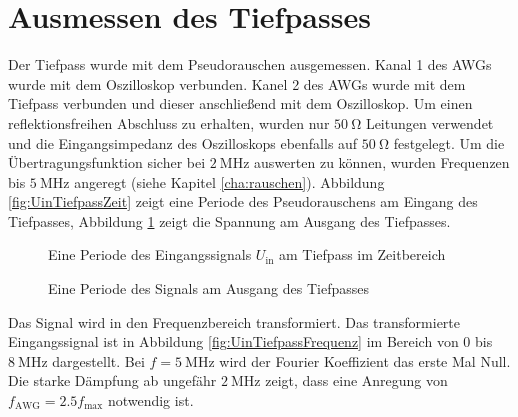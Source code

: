 \documentclass[12pt,report,final,twoside,accentcolor=tud9b,bigchapter]{tudreport}
\newcommand{\Uin}{U_\textrm{in}}
\newcommand{\Uout}{U_\textrm{out}}
\begin{document}
\section{Ausmessen des Tiefpasses}
Der Tiefpass wurde mit dem Pseudorauschen ausgemessen. Kanal 1 des AWGs wurde mit dem Oszilloskop verbunden. Kanel 2 des AWGs wurde mit dem Tiefpass verbunden und dieser anschließend mit dem Oszilloskop. Um einen reflektionsfreihen Abschluss zu erhalten, wurden nur $\SI{50}{\ohm}$ Leitungen verwendet und die Eingangsimpedanz des Oszilloskops ebenfalls auf $\SI{50}{\ohm}$ festgelegt.
Um die Übertragungsfunktion sicher bei $\SI{2}{\mega\hertz}$ auswerten zu können, wurden Frequenzen bis $\SI{5}{\mega\hertz}$ angeregt (siehe Kapitel \ref{cha:rauschen}). Abbildung \ref{fig:UinTiefpassZeit} zeigt eine Periode des Pseudorauschens am Eingang des Tiefpasses, Abbildung \ref{fig:UoutTiefpassZeit} zeigt die Spannung am Ausgang des Tiefpasses. 
\begin{figure}[h!] 
\begin{minipage}[t]{0.48\linewidth}     
  \centering
  \caption{Eine Periode des Eingangssignals $\Uin$ am Tiefpass im Zeitbereich}
  \label{fig:UinTiefpassZeit}
\end{minipage}
  \hfill
\begin{minipage}[t]{0.48\linewidth}     
  \centering
  \caption{Eine Periode des Signals am Ausgang des Tiefpasses}
  \label{fig:UoutTiefpassZeit}
\end{minipage}
\end{figure}

Das Signal wird in den Frequenzbereich transformiert. Das transformierte Eingangssignal ist in Abbildung \ref{fig:UinTiefpassFrequenz} im Bereich von $0$ bis $\SI{8}{\mega\hertz}$ dargestellt. Bei $f=\SI{5}{\mega\hertz}$ wird der Fourier Koeffizient das erste Mal Null. Die starke Dämpfung ab ungefähr $\SI{2}{\mega\hertz}$ zeigt, dass eine Anregung von $f_{\textrm{AWG}}=2.5f_\textrm{max}$ notwendig ist. 
\end{document}
